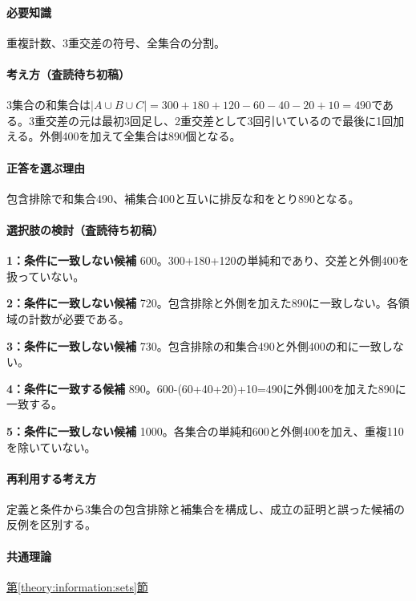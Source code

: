\paragraph{必要知識} 重複計数、3重交差の符号、全集合の分割。

\paragraph{考え方（査読待ち初稿）} 3集合の和集合は\(|A\cup B\cup C|=300+180+120-60-40-20+10=490\)である。3重交差の元は最初3回足し、2重交差として3回引いているので最後に1回加える。外側400を加えて全集合は890個となる。

\paragraph{正答を選ぶ理由} 包含排除で和集合490、補集合400と互いに排反な和をとり890となる。

\paragraph{選択肢の検討（査読待ち初稿）}\mbox{}\par

\noindent\textbf{1：条件に一致しない候補} 600。300+180+120の単純和であり、交差と外側400を扱っていない。\par

\noindent\textbf{2：条件に一致しない候補} 720。包含排除と外側を加えた890に一致しない。各領域の計数が必要である。\par

\noindent\textbf{3：条件に一致しない候補} 730。包含排除の和集合490と外側400の和に一致しない。\par

\noindent\textbf{4：条件に一致する候補} 890。600-(60+40+20)+10=\allowbreak{}490に外側400を加えた890に一致する。\par

\noindent\textbf{5：条件に一致しない候補} 1000。各集合の単純和600と外側400を加え、重複110を除いていない。\par

\paragraph{再利用する考え方} 定義と条件から3集合の包含排除と補集合を構成し、成立の証明と誤った候補の反例を区別する。

\paragraph{共通理論} \hyperref[theory:information:sets]{第\ref*{theory:information:sets}節}

